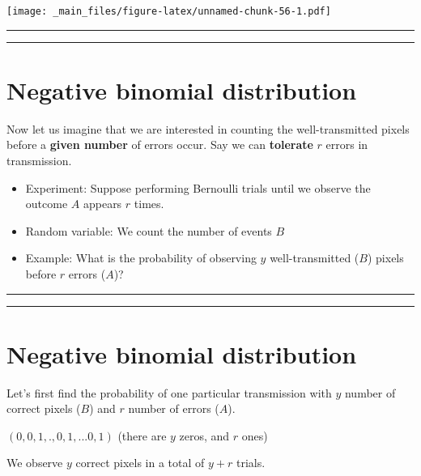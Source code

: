 \documentclass[
]{book}
\begin{document}
\texttt{[image: \_main\_files/figure-latex/unnamed-chunk-56-1.pdf]}

\begin{center}\rule{0.5\linewidth}{0.5pt}\end{center}

\begin{center}\rule{0.5\linewidth}{0.5pt}\end{center}

\hypertarget{negative-binomial-distribution}{%
\section{Negative binomial distribution}\label{negative-binomial-distribution}}

Now let us imagine that we are interested in counting the well-transmitted pixels before a \textbf{given number} of errors occur. Say we can \textbf{tolerate} \(r\) errors in transmission.

\begin{itemize}
\item
  Experiment: Suppose performing Bernoulli trials until we observe the outcome \(A\) appears \(r\) times.
\item
  Random variable: We count the number of events \(B\)
\item
  Example: What is the probability of observing \(y\) well-transmitted (\(B\)) pixels before \(r\) errors (\(A\))?
\end{itemize}

\begin{center}\rule{0.5\linewidth}{0.5pt}\end{center}

\begin{center}\rule{0.5\linewidth}{0.5pt}\end{center}

\hypertarget{negative-binomial-distribution-1}{%
\section{Negative binomial distribution}\label{negative-binomial-distribution-1}}

Let's first find the probability of one particular transmission with \(y\) number of correct pixels (\(B\)) and \(r\) number of errors (\(A\)).

\((0,0,1,., 0,1,...0,1)\) (there are \(y\) zeros, and \(r\) ones)

We observe \(y\) correct pixels in a total of \(y + r\) trials.
\end{document}
